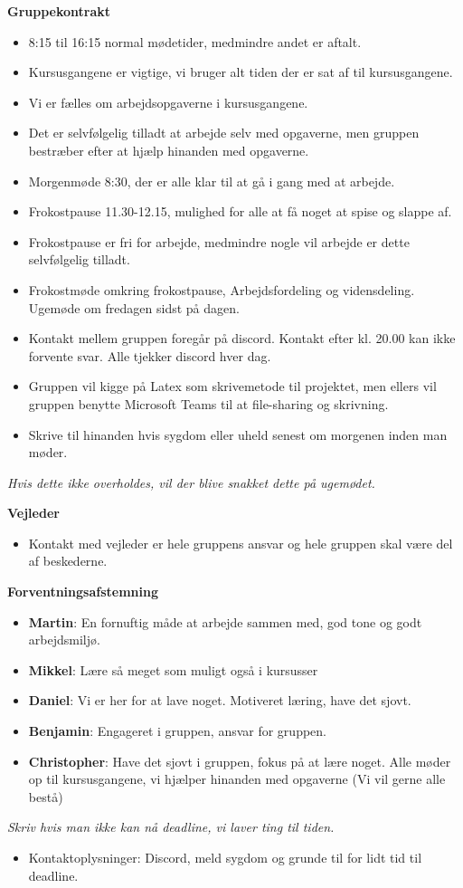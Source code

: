 \textbf{Gruppekontrakt}
\begin{itemize}
    \item 8:15 til 16:15 normal mødetider, medmindre andet er aftalt. 
    \item Kursusgangene er vigtige, vi bruger alt tiden der er sat af til kursusgangene.
    \item Vi er fælles om arbejdsopgaverne i kursusgangene. 
    \item Det er selvfølgelig tilladt at arbejde selv med opgaverne, men gruppen bestræber efter at hjælp hinanden med opgaverne.
    \item Morgenmøde 8:30, der er alle klar til at gå i gang med at arbejde. 
    \item Frokostpause 11.30-12.15, mulighed for alle at få noget at spise og slappe af.
    \item Frokostpause er fri for arbejde, medmindre nogle vil arbejde er dette selvfølgelig tilladt.
    \item Frokostmøde omkring frokostpause, Arbejdsfordeling og vidensdeling.
	Ugemøde om fredagen sidst på dagen. 
    \item Kontakt mellem gruppen foregår på discord. Kontakt efter kl. 20.00 kan ikke forvente svar. Alle tjekker discord hver dag.
    \item Gruppen vil kigge på Latex som skrivemetode til projektet, men ellers vil gruppen benytte Microsoft Teams til at file-sharing og skrivning. 
    \item Skrive til hinanden hvis sygdom eller uheld senest om morgenen inden man møder.
\end{itemize}
\textit{Hvis dette ikke overholdes, vil der blive snakket dette på ugemødet.}
	
\textbf{Vejleder}
\begin{itemize}
    \item Kontakt med vejleder er hele gruppens ansvar og hele gruppen skal være del af beskederne. 
\end{itemize}

\textbf{Forventningsafstemning}
\begin{itemize}
    \item \textbf{Martin}: En fornuftig måde at arbejde sammen med, god tone og godt arbejdsmiljø.
    \item \textbf{Mikkel}: Lære så meget som muligt også i kursusser
    \item \textbf{Daniel}: Vi er her for at lave noget. Motiveret læring, have det sjovt.
    \item \textbf{Benjamin}: Engageret i gruppen, ansvar for gruppen.
    \item \textbf{Christopher}: Have det sjovt i gruppen, fokus på at lære noget. 
	Alle møder op til kursusgangene, vi hjælper hinanden med opgaverne (Vi vil gerne alle bestå)
\end{itemize}
\textit{Skriv hvis man ikke kan nå deadline, vi laver ting til tiden.}

\begin{itemize}
    \item Kontaktoplysninger: Discord, meld sygdom og grunde til for lidt tid til deadline. 
\end{itemize}

